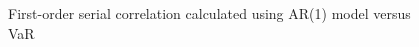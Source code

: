 \documentclass[11pt]{article}
\begin{document}
\begin{figure}[H]
\begin{minipage}[b]{0.48\textwidth}
    \caption{First-order serial correlation calculated using AR(1) model versus VaR}
    \label{fig:SerCol-VaR5yrAR1}
  \end{minipage}
\end{figure}
\end{document}
